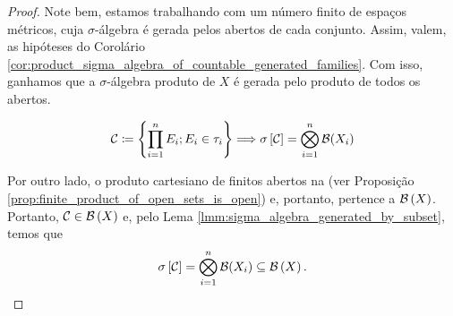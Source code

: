 \begin{proof}
    Note bem, estamos trabalhando com um número finito de espaços métricos, cuja $\sigma$-álgebra é gerada pelos abertos de cada conjunto. Assim, valem, as hipóteses do Corolário \ref{cor:product_sigma_algebra_of_countable_generated_families}. Com isso, ganhamos que a $\sigma$-álgebra produto de $X$ é gerada pelo produto de todos os abertos. 

    \begin{equation*}
        \mathcal{C}\coloneq \left\{\prod_{i=1}^{n} E_i; E_i \in \tau_i \right\} \Longrightarrow \sigma \left[\mathcal{C}\right] = \bigotimes_{i=1}^{n} \mathcal{B}(X_i)
    \end{equation*}
    
    Por outro lado, o produto cartesiano de finitos abertos na  (ver Proposição \ref{prop:finite_product_of_open_sets_is_open}) e, portanto, pertence a $\mathcal{B}\left(X\right)$. Portanto, $\mathcal{C}\in\mathcal{B}\left(X\right)$ e, pelo Lema \ref{lmm:sigma_algebra_generated_by_subset}, temos que
    \begin{equation*}
        \sigma \left[\mathcal{C}\right] = \bigotimes_{i=1}^{n} \mathcal{B}(X_i) \subseteq \mathcal{B}\left(X\right).
    \end{equation*}
\end{proof}